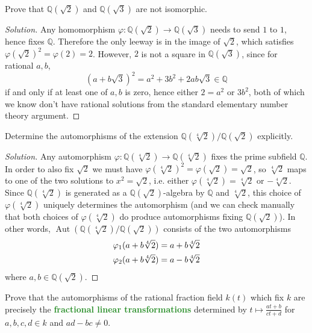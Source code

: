 \documentclass[10pt]{article}
\providecommand{\QQ}{\mathbb Q}
\newenvironment{soln}{\begin{proof}[Solution]}{\end{proof}}
\providecommand{\vocab}[1]{{\textbf{\textcolor{ForestGreen}{#1}}}}
\begin{document}
\begin{problem}
    [\S14.1\#4]
    Prove that $\QQ(\sqrt 2)$ and $\QQ(\sqrt 3)$ are not isomorphic.
\end{problem}

\begin{soln}
    Any homomorphism $\varphi\colon\QQ(\sqrt 2)\to\QQ(\sqrt 3)$
    needs to send $1$ to $1$, hence fixes $\QQ$.
    Therefore the only leeway is in the image of $\sqrt 2$,
    which satisfies $\varphi(\sqrt 2)^2 = \varphi(2) = 2$.
    However, $2$ is not a square in $\QQ(\sqrt 3)$, since
    for rational $a,b$,
    \begin{equation*}
	(a+b\sqrt 3)^2 = a^2 + 3b^2 + 2ab\sqrt 3 \in \QQ
    \end{equation*}
    if and only if at least one of $a,b$ is zero,
    hence either $2 = a^2$ or $3b^2$, both of which we know
    don't have rational solutions from the standard
    elementary number theory argument.
\end{soln}

\begin{problem}
    [\S14.1\#5]
    Determine the automorphisms of the extension
    $\QQ(\sqrt[4]2)/\QQ(\sqrt2)$ explicitly.
\end{problem}

\begin{soln}
    Any automorphism $\varphi\colon\QQ(\sqrt[4]2)\to\QQ(\sqrt[4]2)$
    fixes the prime subfield $\QQ$. In order to also fix $\sqrt 2$
    we must have $\varphi(\sqrt[4]2)^2 = \varphi(\sqrt 2) = \sqrt 2$,
    so $\sqrt[4]2$ maps to one of the two solutions to $x^2 = \sqrt 2$,
    i.e. either $\varphi(\sqrt[4]2) = \sqrt[4]2$ or $-\sqrt[4]2$.
    Since $\QQ(\sqrt[4]2)$ is generated as a $\QQ(\sqrt2)$-algebra
    by $\QQ$ and $\sqrt[4]2$, this choice of $\varphi(\sqrt[4]2)$
    uniquely determines the automorphism
    (and we can check manually that both choices of $\varphi(\sqrt[4]2)$
    do produce automorphisms fixing $\QQ(\sqrt2)$).
    In other words, $\operatorname{Aut}(\QQ(\sqrt[4]2)/\QQ(\sqrt2))$
    consists of the two automorphisms
    \begin{gather*}
	\varphi_1(a + b\sqrt[4]2) = a + b\sqrt[4]2\\
	\varphi_2(a + b\sqrt[4]2) = a - b\sqrt[4]2\qedhere
    \end{gather*}
    where $a,b\in\QQ(\sqrt2)$.
\end{soln}

\begin{problem}
    [\S14.1\#8]
    Prove that the automorphisms of the rational fraction field $k(t)$
    which fix $k$ are precisely the \vocab{fractional linear transformations}
    determined by $t\mapsto\frac{at+b}{ct+d}$
    for $a,b,c,d\in k$ and $ad-bc \ne 0$.
\end{problem}
\end{document}
